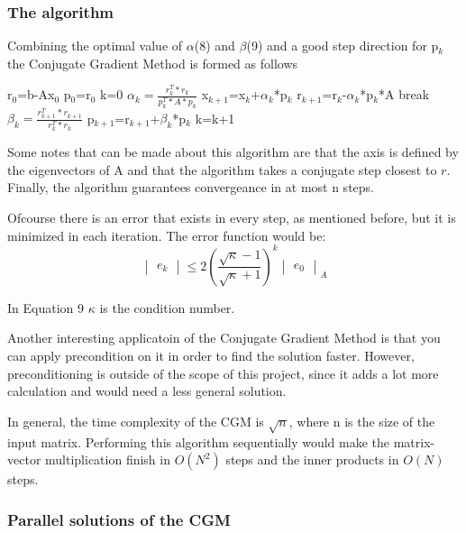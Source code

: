 \documentclass[12pt,a4paper]{article}
\begin{document}
\subsubsection{The algorithm}
Combining the optimal value of $\alpha$(8) and $\beta$(9) and a good step direction for p$_k$ the Conjugate Gradient Method is formed as follows
\\
\begin{algorithmic}
\STATE r$_0$=b-Ax$_0$
\STATE p$_0$=r$_0$
\STATE k=0
\STATE $\alpha_k=\frac{r_k ^T*r_k}{p_k ^T*A*p_k}$
\STATE x$_{k+1}$=x$_k$+$\alpha_k$*p$_k$
\STATE r$_{k+1}$=r$_k$-$\alpha_k$*p$_k$*A
\STATE break
\ENDIF
\STATE $\beta_k=\frac{r_{k+1} ^T*r_{k+1}}{r_k ^T*r_k}$
\STATE p$_{k+1}$=r$_{k+1}$+$\beta_k$*p$_k$
\STATE k=k+1
\ENDFOR
\end{algorithmic}
\vspace{20pt}
Some notes that can be made about this algorithm are that the axis is defined by the eigenvectors of A and that the algorithm takes a conjugate step closest to $r$. Finally, the algorithm guarantees convergeance in at most n steps.\cite{press2007numerical}\cite{shewchuk1994introduction}\cite{cgm2009lec}

Ofcourse there is an error that exists in every step, as mentioned before, but it is minimized in each iteration. The error function would be:
\begin{equation}
\begin{vmatrix}
e_k
\end{vmatrix}
\leq 2(\frac{\sqrt{\kappa}-1}{\sqrt{\kappa}+1})^k
\begin{vmatrix}
e_0
\end{vmatrix}_A
\end{equation}

In Equation 9 $\kappa$ is the condition number.

Another interesting applicatoin of the Conjugate Gradient Method is that you can apply precondition on it in order to find the solution faster. However, preconditioning is outside of the scope of this project, since it adds a lot more calculation and would need a less general solution.

In general, the time complexity of the CGM is $\sqrt{n}$, where n is the size of the input matrix. Performing this algorithm sequentially would make the matrix-vector multiplication finish in $O(N^2)$ steps and the inner products in $O(N)$ steps.
\subsubsection{Parallel solutions of the CGM}
\end{document}
